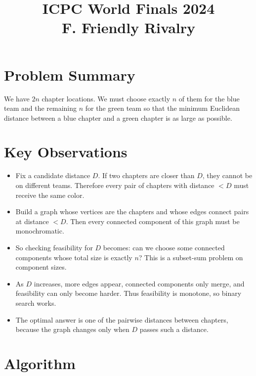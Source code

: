 \documentclass[11pt]{article}
\title{ICPC World Finals 2024\\F. Friendly Rivalry}
\author{}
\date{}
\begin{document}
\maketitle

\section*{Problem Summary}

We have $2n$ chapter locations. We must choose exactly $n$ of them for the blue team and the remaining $n$ for the green team so that the minimum Euclidean distance between a blue chapter and a green chapter is as large as possible.

\section*{Key Observations}

\begin{itemize}[leftmargin=*]
    \item Fix a candidate distance $D$. If two chapters are closer than $D$, they cannot be on different teams. Therefore every pair of chapters with distance $< D$ must receive the same color.
    \item Build a graph whose vertices are the chapters and whose edges connect pairs at distance $< D$. Then every connected component of this graph must be monochromatic.
    \item So checking feasibility for $D$ becomes: can we choose some connected components whose total size is exactly $n$? This is a subset-sum problem on component sizes.
    \item As $D$ increases, more edges appear, connected components only merge, and feasibility can only become harder. Thus feasibility is monotone, so binary search works.
    \item The optimal answer is one of the pairwise distances between chapters, because the graph changes only when $D$ passes such a distance.
\end{itemize}

\section*{Algorithm}
\end{document}

